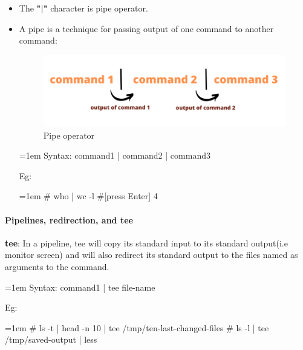 \setlength{\columnsep}{3pt}
\begin{flushleft}
	\begin{itemize}
		\item The \textbf{"|"} character is pipe operator.
		\item A pipe is a technique for passing output of one command to another command:
		\bigskip
		\bigskip
		\begin{figure}[h!]
			\centering
			\includegraphics[scale=0.5]{content/chapter7/images/pipe.png}
			\caption{Pipe operator}
			\label{fig:pipe_operator}
		\end{figure}

		\bigskip
		\begin{tcolorbox}[breakable,notitle,boxrule=0pt,colback=pink,colframe=pink]
			\color{black}
			\font=1em
			Syntax: command1 | command2 | command3
			\font=4pt
		\end{tcolorbox}
	
		Eg: 
		\bigskip
		\begin{tcolorbox}[breakable,notitle,boxrule=-0pt,colback=black,colframe=black]
			\color{green}
			\font=1em
			\# who | wc -l 			\color{yellow}#[press Enter]
			\newline
			\color{white}
			4
			\font=4pt
		\end{tcolorbox}
	
	\end{itemize}
	
	\paragraph{Pipelines, redirection, and tee}
	\textbf{tee}: In a pipeline, tee will copy its standard input to its standard output(i.e monitor screen) and will also redirect its standard output to the files named as arguments to the command.
	\begin{tcolorbox}[breakable,notitle,boxrule=0pt,colback=pink,colframe=pink]
		\color{black}
		\font=1em
		Syntax: command1 | tee file-name
		\font=4pt
	\end{tcolorbox}
	Eg:
	\begin{tcolorbox}[breakable,notitle,boxrule=-0pt,colback=black,colframe=black]
		\color{green}
		\font=1em
		\# ls -t | head -n 10 | tee /tmp/ten-last-changed-files
		\newline
		\# ls -l | tee /tmp/saved-output | less
		\font=4pt
	\end{tcolorbox}
		
	
	
\end{flushleft}

\newpage

